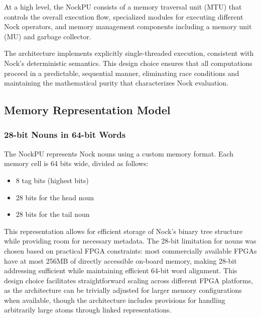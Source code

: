 \documentclass[twoside]{article}
\begin{document}
\noindent

At a high level, the NockPU consists of a memory traversal unit (MTU) that controls the overall execution flow, specialized modules for executing different Nock operators, and memory management components including a memory unit (MU) and garbage collector.

The architecture implements explicitly single-threaded execution, consistent with Nock's deterministic semantics. This design choice ensures that all computations proceed in a predictable, sequential manner, eliminating race conditions and maintaining the mathematical purity that characterizes Nock evaluation.

\subsection{Memory Representation Model}

\subsubsection{28-bit Nouns in 64-bit Words}

The NockPU represents Nock nouns using a custom memory format. Each memory cell is 64 bits wide, divided as follows:

\begin{itemize}
  \item 8 tag bits (highest bits)
  \item 28 bits for the head noun
  \item 28 bits for the tail noun
\end{itemize}

\noindent
This representation allows for efficient storage of Nock's binary tree structure while providing room for necessary metadata. The 28-bit limitation for nouns was chosen based on practical FPGA constraints: most commercially available FPGAs have at most 256MB of directly accessible on-board memory, making 28-bit addressing sufficient while maintaining efficient 64-bit word alignment. This design choice facilitates straightforward scaling across different FPGA platforms, as the architecture can be trivially adjusted for larger memory configurations when available, though the architecture includes provisions for handling arbitrarily large atoms through linked representations.
\end{document}

